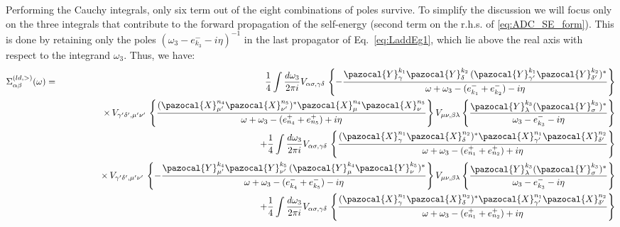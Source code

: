 Performing the Cauchy integrals, only six term out of the eight combinations of poles survive. To simplify the discussion 
we will focus only on the three integrals that contribute to the forward propagation of the self-energy (second term on the r.h.s.
 of \eqref{eq:ADC_SE_form}). This is done by retaining only the poles $(\omega_3  - e^-_{k_3} - i\eta)^{-1}$ in the
 last propagator of Eq.~\eqref{eq:LaddEg1}, which lie above the real axis with respect to the integrand $\omega_3$. Thus,
 we have:
 \begin{eqnarray}
  \Sigma^{(ld,>)}_{\alpha\beta}(\omega) &=& 
 \frac{1}{4}  \int \frac{d\omega_3}{2\pi i} 
    V_{\alpha\sigma,\gamma\delta} \,
  \left\{
 -  \frac{ \pazocal{Y}^{k_1}_\gamma \pazocal{Y}^{k_2}_\delta \, ( \pazocal{Y}^{k_1}_{\gamma'} \pazocal{Y}^{k_2}_{\delta'})^*}
                     {\omega+\omega_3  - (e^-_{k_1} + e^-_{k_2}) - i\eta}
  \right\}
\nonumber \\
&& \qquad \qquad \times
   \, V_{\gamma' \delta', \mu' \nu'} \,  \left\{
    \frac{( \pazocal{X}^{n_4}_{\mu'} \pazocal{X}^{n_5}_{\nu'})^*  \pazocal{X}^{n_4}_\mu \pazocal{X}^{n_5}_\nu}
                      {\omega+\omega_3  - (e^+_{n_4}  + e^+_{n_5}) + i\eta} 
  \right\}
  V_{\mu \nu, \beta \lambda}
   \left\{  \frac{\pazocal{Y}^{k_3}_\lambda  (\pazocal{Y}^{k_3}_\sigma)^*}{\omega_3  - e^-_{k_3} - i\eta}  \right\}
     \nonumber \\
&&+
 \frac{1}{4}  \int \frac{d\omega_3}{2\pi i} 
    V_{\alpha\sigma,\gamma\delta} \,
  \left\{
    \frac{(\pazocal{X}^{n_1}_\gamma \pazocal{X}^{n_2}_\delta)^*  \pazocal{X}^{n_1}_{\gamma'} \pazocal{X}^{n_2}_{\delta'}}
                      {\omega+\omega_3  - (e^+_{n_1}  + e^+_{n_2}) + i\eta} 
  \right\}
\nonumber \\
&& \qquad \qquad \times
   \, V_{\gamma' \delta', \mu' \nu'} \,  \left\{
 -  \frac{ \pazocal{Y}^{k_4}_{\mu'} \pazocal{Y}^{k_5}_{\nu'} \, (\pazocal{Y}^{k_4}_\mu \pazocal{Y}^{k_5}_\nu)^*}
                     {\omega+\omega_3  - (e^-_{k_4} + e^-_{k_5}) - i\eta}
  \right\}
  V_{\mu \nu, \beta \lambda}
   \left\{  \frac{\pazocal{Y}^{k_3}_\lambda  (\pazocal{Y}^{k_3}_\sigma)^*}{\omega_3  - e^-_{k_3} - i\eta}  \right\}
     \nonumber \\
&&+
 \frac{1}{4}  \int \frac{d\omega_3}{2\pi i} 
    V_{\alpha\sigma,\gamma\delta} \,
  \left\{
    \frac{(\pazocal{X}^{n_1}_\gamma \pazocal{X}^{n_2}_\delta)^*  \pazocal{X}^{n_1}_{\gamma'} \pazocal{X}^{n_2}_{\delta'}}
                      {\omega+\omega_3  - (e^+_{n_1}  + e^+_{n_2}) + i\eta} 
  \right\}
\nonumber \\

\end{eqnarray}
